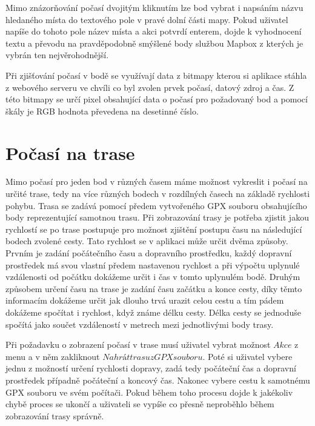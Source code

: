 \documentclass[czech,bachelor,dept460,male,csharp,cpdeclaration]{diploma}
\begin{document}
	Mimo znázorňování počasí dvojitým kliknutím lze bod vybrat i napsáním názvu hledaného místa do textového pole v pravé dolní části mapy. Pokud uživatel napíše do tohoto pole název místa a akci potvrdí enterem, dojde k vyhodnocení textu a převodu na pravděpodobně smýšlené body službou Mapbox \cite{mapbox} z kterých je vybrán ten nejvěrohodnější. 
	
	Při zjišťování počasí v bodě se využívají data z bitmapy kterou si aplikace stáhla z webového serveru ve chvíli co byl zvolen prvek počasí, datový zdroj a čas. Z této bitmapy se určí pixel obsahující data o počasí pro požadovaný bod a pomocí škály je RGB hodnota převedena na desetinné číslo.
	
	\section{Počasí na trase}
	
	Mimo počasí pro jeden bod v různých časem máme možnost vykreslit i počasí na určité trase, tedy na více různých bodech v rozdílných časech na základě rychlosti pohybu. Trasa se zadává pomocí předem vytvořeného GPX souboru obsahujícího body reprezentující samotnou trasu. Při zobrazování trasy je potřeba zjistit jakou rychlostí se po trase postupuje pro možnost zjištění postupu času na následující bodech zvolené cesty. Tato rychlost se v aplikaci může určit dvěma způsoby. Prvním je zadání počátečního času a dopravního prostředku, každý dopravní prostředek má svou vlastní předem nastavenou rychlost a při výpočtu uplynulé vzdálenosti od počátku dokážeme určit i čas v tomto uplynulém bodě. Druhým způsobem určení času na trase je zadání času začátku a konce cesty, díky těmto informacím dokážeme určit jak dlouho trvá urazit celou cestu a tím pádem dokážeme spočítat i rychlost, když známe délku cesty. Délka cesty se jednoduše spočítá jako součet vzdáleností v metrech mezi jednotlivými body trasy.
	
	Při požadavku o zobrazení počasí v trase musí uživatel vybrat možnost $Akce$ z menu a v něm zakliknout $Nahrát trasu z GPX souboru$. Poté si uživatel vybere jednu z možností určení rychlosti dopravy, zadá tedy počáteční čas a dopravní prostředek případně počáteční a koncový čas. Nakonec vybere cestu k samotnému GPX souboru ve svém počítači. Pokud během toho procesu dojde k jakékoliv chybě proces se ukončí a uživateli se vypíše co přesně neproběhlo během zobrazování trasy správně.
	
\end{document}

